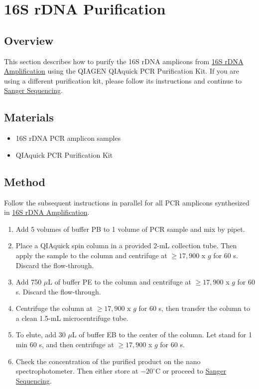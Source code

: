 \documentclass[onecolumn]{article}
\begin{document}
\section{16S rDNA Purification}\label{1rP}
\subsection{Overview}
This section describes how to purify the 16S rDNA amplicons from \hyperref[1rA]{16S rDNA Amplification} using the QIAGEN QIAquick PCR Purification Kit.
If you are using a different purification kit,
please follow its instructions and continue to \hyperref[SS]{Sanger Sequencing}.

\subsection{Materials}
\begin{itemize}
  \item 16S rDNA PCR amplicon samples
  \item QIAquick PCR Purification Kit
\end{itemize}

\subsection{Method}
Follow the subsequent instructions in parallel for all PCR amplicons synthesized in \hyperref[1rA]{16S rDNA Amplification}.
\begin{enumerate}
  \item Add 5 volumes of buffer PB to 1 volume of PCR sample and mix by pipet.
  \item Place a QIAquick spin column in a provided 2-mL collection tube. Then apply the sample to the column and centrifuge at $\geq17,900$ x $g$ for 60 s. Discard the flow-through.
  \item Add 750 $\mu$L of buffer PE to the column and centrifuge at $\geq17,900$ x $g$ for 60 s. Discard the flow-through.
  \item Centrifuge the column at $\geq17,900$ x $g$ for 60 s, then transfer the column to a clean 1.5-mL microcentrifuge tube.
  \item To elute, add 30 $\mu$L of buffer EB to the center of the column. Let stand for 1 min 60 s, and then centrifuge at $\geq17,900$ x $g$ for 60 s.
  \item Check the concentration of the purified product on the nano spectrophotometer. Then either store at $-20^\circ$C or proceed to \hyperref[SS]{Sanger Sequencing}.
\end{enumerate}
\end{document}
